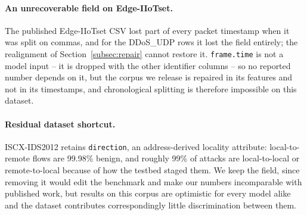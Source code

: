 \paragraph{An unrecoverable field on Edge-IIoTset.}
The published Edge-IIoTset CSV lost part of every packet timestamp when it was
split on commas, and for the DDoS\_UDP rows it lost the field entirely; the
realignment of Section~\ref{subsec:repair} cannot restore it. \texttt{frame.time}
is not a model input -- it is dropped with the other identifier columns -- so no
reported number depends on it, but the corpus we release is repaired in its
features and not in its timestamps, and chronological splitting is therefore
impossible on this dataset.

\paragraph{Residual dataset shortcut.}
ISCX-IDS2012 retains \texttt{direction}, an address-derived locality attribute:
local-to-remote flows are 99.98\% benign, and roughly 99\% of attacks are
local-to-local or remote-to-local because of how the testbed staged them. We keep
the field, since removing it would edit the benchmark and make our numbers
incomparable with published work, but results on this corpus are optimistic for
every model alike and the dataset contributes correspondingly little
discrimination between them.
